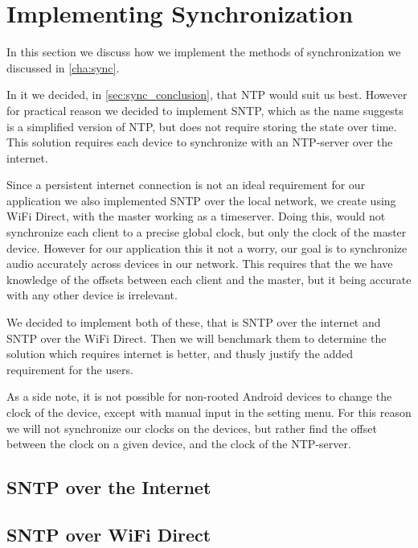 \section{Implementing Synchronization}\label{sec:impl_sync}
In this section we discuss how we implement the methods of synchronization we discussed in \cref{cha:sync}.

In it we decided, in \cref{sec:sync_conclusion}, that NTP would suit us best.
However for practical reason we decided to implement \ac{SNTP}, which as the name suggests is a simplified version of \ac{NTP}, but does not require storing the state over time.
This solution requires each device to synchronize with an \ac{NTP}-server over the internet.

Since a persistent internet connection is not an ideal requirement for our application we also implemented \ac{SNTP} over the local network, we create using WiFi Direct, with the master working as a timeserver.
Doing this, would not synchronize each client to a precise global clock, but only the clock of the master device.
However for our application this it not a worry, our goal is to synchronize audio accurately across devices in our network.
This requires that the we have knowledge of the offsets between each client and the master, but it being accurate with any other device is irrelevant.

We decided to implement both of these, that is \ac{SNTP} over the internet and \ac{SNTP} over the WiFi Direct.
Then we will benchmark them to determine the solution which requires internet is better, and thusly justify the added requirement for the users.

As a side note, it is not possible for non-rooted Android devices to change the clock of the device, except with manual input in the setting menu.
For this reason we will not synchronize our clocks on the devices, but rather find the offset between the clock on a given device, and the clock of the \ac{NTP}-server.

\subsection{\ac{SNTP} over the Internet}


\subsection{\ac{SNTP} over WiFi Direct}


